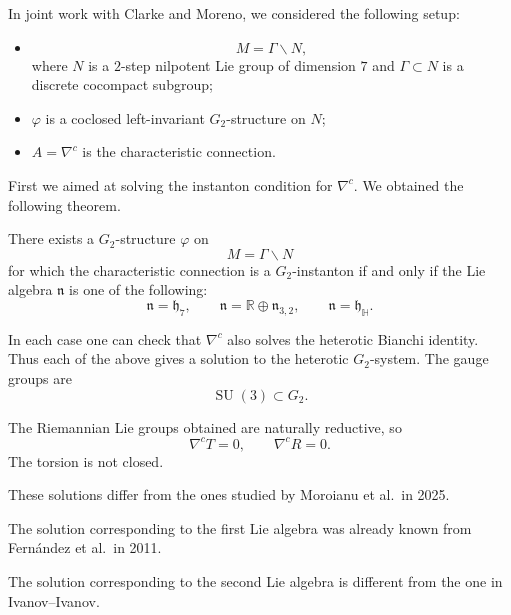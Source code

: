 In joint work with Clarke and Moreno,
we considered the following setup:
\begin{itemize}
\item
\[
        M=\Gamma\backslash N,
\]
where $N$ is a $2$-step nilpotent Lie
group of dimension $7$ and
$\Gamma\subset N$ is a discrete
cocompact subgroup;
\item $\varphi$ is a coclosed
left-invariant $G_2$-structure on
$N$;
\item $A=\nabla^c$ is the
characteristic connection.
\end{itemize}

First we aimed at solving the
instanton condition for $\nabla^c$.
We obtained the following theorem.

\begin{theorem}
\label{theorem-exists-g}
There exists a $G_2$-structure
$\varphi$ on
\[
        M=\Gamma\backslash N
\]
for which the characteristic
connection is a $G_2$-instanton if
and only if the Lie algebra
$\mathfrak n$ is one of the following:
\[
        \mathfrak n=\mathfrak h_7,
        \qquad
        \mathfrak n=\mathbb R
        \oplus\mathfrak n_{3,2},
        \qquad
        \mathfrak n=\mathfrak h_{\mathbb H}.
\]
\end{theorem}

In each case one can check that
$\nabla^c$ also solves the heterotic
Bianchi identity.
Thus each of the above gives a
solution to the heterotic
$G_2$-system.
The gauge groups are
\[
        \operatorname{SU}(3)
        \subset G_2.
\]

The Riemannian Lie groups obtained
are naturally reductive, so
\[
        \nabla^cT=0,
        \qquad
        \nabla^cR=0.
\]
The torsion is not closed.

\begin{remark}
\label{remark-solutions-differ}
These solutions differ from the ones
studied by Moroianu et al.\ in 2025.
\end{remark}

\begin{remark}
\label{remark-solution}
The solution corresponding to the
first Lie algebra was already known
from Fern\'andez et al.\ in 2011.
\end{remark}

\begin{remark}
\label{remark-solution2}
The solution corresponding to the
second Lie algebra is different from
the one in Ivanov--Ivanov.
\end{remark}

